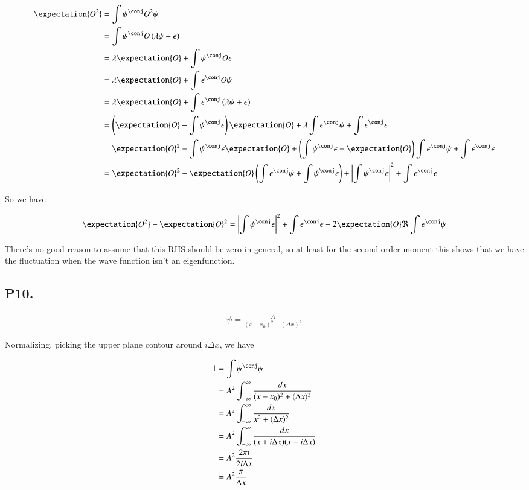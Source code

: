 \documentclass{article}
\begin{document}
\begin{align*}
\expectation{O^2}
&= \int \psi^\conj O^2 \psi \\
&= \int \psi^\conj O \left( \lambda \psi + \epsilon \right) \\
&= \lambda \expectation{O} + \int \psi^\conj O \epsilon \\
&= \lambda \expectation{O} + \int \epsilon^\conj O \psi \\
&= \lambda \expectation{O} + \int \epsilon^\conj \left(\lambda \psi + \epsilon\right) \\
&= \left(\expectation{O} - \int \psi^\conj \epsilon \right)\expectation{O} + 
\lambda \int \epsilon^\conj \psi 
+ \int \epsilon^\conj \epsilon 
\\
&= \expectation{O}^2 - \int \psi^\conj \epsilon \expectation{O} + \left( \int \psi^\conj \epsilon - \expectation{O}\right) \int \epsilon^\conj \psi + \int \epsilon^\conj \epsilon 
\\
&= \expectation{O}^2 
- \expectation{O} \left( \int \epsilon^\conj \psi + \int \psi^\conj \epsilon \right)
+ \Abs{\int \psi^\conj \epsilon}^2
+ \int \epsilon^\conj \epsilon 
\\
\end{align*}

So we have

\begin{align*}
\expectation{O^2} - \expectation{O}^2 
&= 
\Abs{\int \psi^\conj \epsilon}^2 + \int \epsilon^\conj \epsilon - 2 \expectation{O} \Re \int \epsilon^\conj \psi \\
\end{align*}

There's no good reason to assume that this RHS should be zero in general, so at least for the second order moment this shows that we have the fluctuation when the wave
function isn't an eigenfunction.

\subsection{P10. }

\begin{align*}
\psi = \frac{A}{(x-x_0)^2 + (\Delta x)^2}
\end{align*}

Normalizing, picking the upper plane contour around $i \Delta x$, we have

\begin{align*}
1 &= \int \psi^\conj \psi \\
&= A^2 \int_{-\infty}^\infty \frac{dx}{(x-x_0)^2 + (\Delta x)^2} \\
&= A^2 \int_{-\infty}^\infty \frac{dx}{x^2 + (\Delta x)^2} \\
&= A^2 \int_{-\infty}^\infty \frac{dx}{(x + i\Delta x)(x - i \Delta x)} \\
&= A^2 \frac{2 \pi i }{2 i\Delta x} \\
&= A^2 \frac{\pi}{\Delta x} \\
\end{align*}
\end{document}
